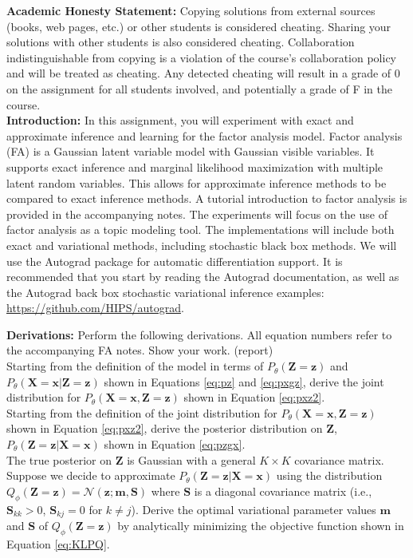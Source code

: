 \documentclass[11pt]{article}
\newcommand{\mbf}[1]{{\mathbf{#1}}}
\begin{document}
\textbf{Academic Honesty Statement:} Copying solutions from external
sources (books, web pages, etc.) or other students is considered
cheating. Sharing your solutions with other students is also
considered cheating. Collaboration indistinguishable from copying is a violation 
of the course's collaboration policy and will be treated as cheating.
Any detected cheating will result in a grade of 0
on the assignment for all students involved, and potentially a grade
of F in the course.\\

\textbf{Introduction:} In this assignment, you will experiment with 
exact and approximate inference and learning for the factor analysis model. 
Factor analysis (FA) is a Gaussian latent variable model with Gaussian visible variables. 
It supports exact inference and marginal likelihood maximization with multiple
latent random variables. This allows for approximate inference methods
to be compared to exact inference methods. A tutorial introduction to
factor analysis is provided in the accompanying notes. The experiments
will focus on the use of factor analysis as a topic modeling tool. The implementations
will include both  exact and variational methods, including
stochastic black box methods. We will use the Autograd package
for automatic differentiation support.  It is recommended that you start
by reading the Autograd documentation, as well as the Autograd
back box stochastic variational inference examples: 
\url{https://github.com/HIPS/autograd}.
\\


\begin{problem}{25} \textbf{Derivations:} Perform the following derivations. All equation numbers refer to the accompanying FA notes. Show your work. (report)\\

 Starting from the definition of the model in terms of $P_{\theta}(\mbf{Z}=\mbf{z})$ and $P_{\theta}(\mbf{X}=\mbf{x}|\mbf{Z}=\mbf{z})$ shown in Equations \ref{eq:pz} and \ref{eq:pxgz}, derive the joint distribution for $P_{\theta}(\mbf{X}=\mbf{x},\mbf{Z}=\mbf{z})$ shown in Equation \ref{eq:pxz2}.\\

 Starting from the definition of the joint distribution for $P_{\theta}(\mbf{X}=\mbf{x},\mbf{Z}=\mbf{z})$ shown in Equation \ref{eq:pxz2}, derive the posterior distribution on $\mbf{Z}$, $P_{\theta}(\mbf{Z}=\mbf{z}|\mbf{X}=\mbf{x})$ shown in Equation \ref{eq:pzgx}.\\

 The true posterior on $\mbf{Z}$ is Gaussian with a general $K\times K$ covariance matrix. Suppose we
decide to approximate $P_{\theta}(\mbf{Z}=\mbf{z}|\mbf{X}=\mbf{x})$ using the distribution $Q_{\phi}(\mbf{Z}=\mbf{z})=\mathcal{N}(\mbf{z};\mbf{m},\mbf{S})$
where $\mbf{S}$ is a diagonal covariance matrix (i.e., $\mbf{S}_{kk}>0$, $\mbf{S}_{kj}=0$ for $k\neq j$). 
Derive the optimal variational parameter values $\mbf{m}$ and $\mbf{S}$ of $Q_{\phi}(\mbf{Z}=\mbf{z})$ by
analytically minimizing the objective function shown in Equation \ref{eq:KLPQ}.

\end{problem}
\end{document}
